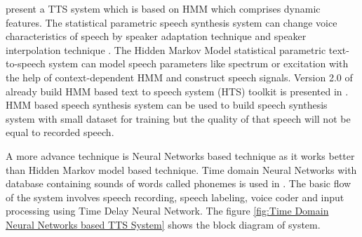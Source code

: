 \cite{masuko1996speech} present a TTS system which is based on HMM which comprises dynamic features. The statistical parametric speech synthesis system can change voice characteristics of speech by speaker adaptation technique \cite{tamura1998speaker} and speaker interpolation technique \cite{yoshimura2001speaker}. The Hidden Markov Model statistical parametric text-to-speech system can model speech parameters like spectrum or excitation with the help of context-dependent HMM and construct speech signals. Version 2.0 of already build HMM based text to speech system (HTS) toolkit is presented in \cite{zen2007hmm}. HMM based speech synthesis system can be used to build speech synthesis system with small dataset for training \cite{huang2001spoken} but the quality of that speech will not be equal to recorded speech. 



A more advance technique is Neural Networks based technique as it works better than Hidden Markov model based technique. Time domain Neural Networks with database containing sounds of words called phonemes is used in \cite{karaali1998text}. The basic flow of the system involves speech recording, speech labeling, voice coder and input processing using Time Delay Neural Network. The figure \ref{fig:Time Domain Neural Networks based TTS System} shows the block diagram of system.

